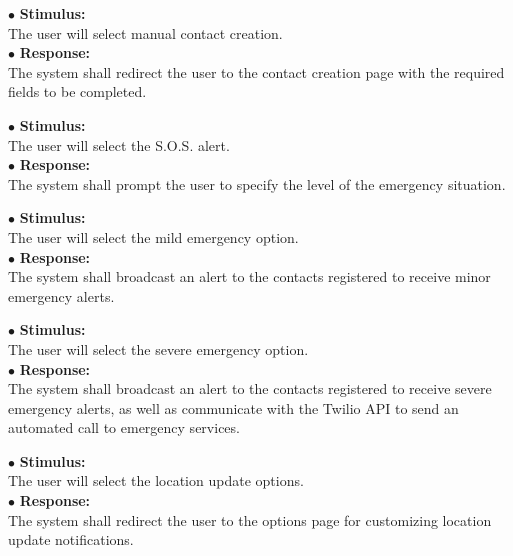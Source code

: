 \documentclass{scrreprt}
\begin{document}
\vspace{5mm}
	\hspace{-4.75mm} $\bullet$ \textbf{Stimulus:} \\ \hspace{5mm} The user will select manual contact creation.\\
	$\bullet$ \textbf{Response:} \\ \hspace{5mm} The system shall redirect the user to the contact creation page with the required fields to be completed.

\vspace{5mm}
	\hspace{-4.75mm} $\bullet$ \textbf{Stimulus:} \\ \hspace{5mm} The user will select the S.O.S. alert.\\
	$\bullet$ \textbf{Response:} \\ \hspace{5mm} The system shall prompt the user to specify the level of the emergency situation.

\vspace{5mm}
	\hspace{-4.75mm} $\bullet$ \textbf{Stimulus:} \\ \hspace{5mm} The user will select the mild emergency option.\\
	$\bullet$ \textbf{Response:} \\ \hspace{5mm} The system shall broadcast an alert to the contacts registered to receive minor emergency alerts.

\vspace{5mm}
	\hspace{-4.75mm} $\bullet$ \textbf{Stimulus:} \\ \hspace{5mm} The user will select the severe emergency option.\\
	$\bullet$ \textbf{Response:} \\ \hspace{5mm} The system shall broadcast an alert to the contacts registered to receive severe emergency alerts, as well as communicate with the Twilio API to send an automated call to emergency services.

\vspace{5mm}
	\hspace{-4.75mm} $\bullet$ \textbf{Stimulus:} \\ \hspace{5mm} The user will select the location update options.\\
	$\bullet$ \textbf{Response:} \\ \hspace{5mm} The system shall redirect the user to the options page for customizing location update notifications.
\end{document}
